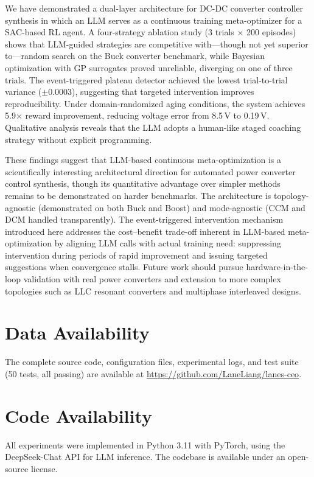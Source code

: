 \documentclass[11pt,a4paper]{article}
\begin{document}
We have demonstrated a dual-layer architecture for DC-DC converter controller
synthesis in which an LLM serves as a continuous training meta-optimizer for
a SAC-based RL agent.
A four-strategy ablation study (3 trials $\times$ 200 episodes) shows that LLM-guided
strategies are competitive with---though not yet superior to---random search on the
Buck converter benchmark, while Bayesian optimization with GP surrogates proved
unreliable, diverging on one of three trials.
The event-triggered plateau detector achieved the lowest trial-to-trial variance
($\pm$0.0003), suggesting that targeted intervention improves reproducibility.
Under domain-randomized aging conditions, the system achieves 5.9$\times$
reward improvement, reducing voltage error from 8.5\,V to 0.19\,V.
Qualitative analysis reveals that the LLM adopts a human-like staged coaching
strategy without explicit programming.

These findings suggest that LLM-based continuous meta-optimization is a
scientifically interesting architectural direction for automated power
converter control synthesis, though its quantitative advantage over simpler
methods remains to be demonstrated on harder benchmarks.
The architecture is topology-agnostic (demonstrated on both Buck and Boost)
and mode-agnostic (CCM and DCM handled transparently).
The event-triggered intervention mechanism introduced here addresses the
cost--benefit trade-off inherent in LLM-based meta-optimization by aligning
LLM calls with actual training need: suppressing intervention during periods
of rapid improvement and issuing targeted suggestions when convergence stalls.
Future work should pursue hardware-in-the-loop validation with real power
converters and extension to more complex topologies such as LLC resonant
converters and multiphase interleaved designs.

\section*{Data Availability}
The complete source code, configuration files, experimental logs, and test
suite (50 tests, all passing) are available at
\url{https://github.com/LaneLiang/lanes-ceo}.

\section*{Code Availability}
All experiments were implemented in Python 3.11 with PyTorch, using the
DeepSeek-Chat API for LLM inference. The codebase is available under an
open-source license.
\end{document}
